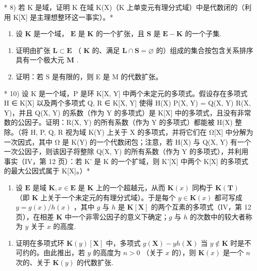 * 8) 若 K 是域，证明 K 在域 K(X)（K 上单变元有理分式域）中是代数闭的（利用 K{[}X{]} 是主理想整环这一事实）。*

\begin{enumerate}
\def\labelenumi{\arabic{enumi})}
\setcounter{enumi}{8}
\tightlist
\item
  设 \(\mathbf{K}\) 是一个域， \(\mathbf{E}\) 是 \(\mathbf{K}\) 的一个扩张，且 \(\mathbf{S}\) 是 \(\mathbf{E} - \mathbf{K}\) 的一个子集.
\end{enumerate}

\begin{enumerate}
\def\labelenumi{\alph{enumi})}
\item
  证明由扩张 \(\mathbf{L} \subset \mathbf{E}\) （ \(\mathbf{K}\) 的、满足 \(\mathbf{L} \cap \mathbf{S} = \varnothing\) 的）组成的集合按包含关系排序具有一个极大元 \(\mathbf{M}\) .
\item
  证明：若 S 是有限的，则 E 是 M 的代数扩张。
\end{enumerate}

* 10) 设 K 是一个域，P 是环 K{[}X, Y{]} 中两个未定元的多项式。假设存在多项式 H ∈ K{[}X{]} 以及两个多项式 Q, R ∈ K{[}X, Y{]} 使得 H(X) P(X, Y) = Q(X, Y) R(X, Y)，并且 Q(X, Y) 的系数（作为 Y 的多项式）是 K{[}X{]} 中的多项式，且没有非常数的公因子。证明：R(X, Y) 的所有系数（作为 Y 的多项式）都能被 H(X) 整除。（将 H, P, Q, R 视为域 K(Y) 上关于 X 的多项式，并将它们在 Ω{[}X{]} 中分解为一次因式，其中 Ω 是 K(Y) 的一个代数闭包；注意，若 H(X) 与 Q(X, Y) 有一个一次公因子，则该因子将整除 Q(X, Y) 的所有系数（作为 Y 的多项式），并利用事实（IV，第 12 页）：若 K' 是 K 的一个扩域，则 K'{[}X{]} 中两个 K{[}X{]} 的多项式的最大公因式属于 K{[}X{]}。）*

\begin{enumerate}
\def\labelenumi{\arabic{enumi})}
\setcounter{enumi}{10}
\tightlist
\item
  设 \(\mathbf{E}\) 是域 \(\mathbf{K}, x \in \mathbf{E}\) 是 \(\mathbf{K}\) 上的一个超越元，从而 \(\mathbf{K}(x)\) 同构于 \(\mathbf{K}(\mathbf{T})\) （即 \(\mathbf{K}\) 上关于一个未定元的有理分式域）。于是每个 \(y \in \mathbf{K}(x)\) 都可写成 \(y = g(x) / h(x)\) ，其中 \(g\) 与 \(h\) 是 \(\mathbf{K}[\mathbf{X}]\) 的两个互素的多项式（IV，第 12 页），在相差 \(\mathbf{K}\) 中一个非零公因子的意义下确定；\(g\) 与 \(h\) 的次数中的较大者称为 \(y\) 关于 \(x\) 的高度.
\end{enumerate}

\begin{enumerate}
\def\labelenumi{\alph{enumi})}
\tightlist
\item
  证明在多项式环 \(\mathbf{K}(y)[\mathbf{X}]\) 中，多项式 \(g(\mathbf{X}) - yh(\mathbf{X})\) 当 \(y \notin \mathbf{K}\) 时是不可约的。由此推出，若 \(y\) 的高度为 \(n > 0\) （关于 \(x\) 的），则 \(\mathbf{K}(x)\) 是一个 \(n\) 次的、关于 \(\mathbf{K}(y)\) 的代数扩张.
\end{enumerate}

